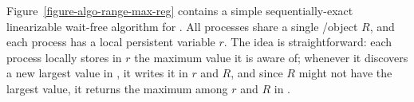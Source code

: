 Figure~\ref{figure-algo-range-max-reg} contains a simple sequentially-exact linearizable wait-free algorithm for \RangeMaxReg. All processes share a single \R/\W object \(R\), and each process has a local persistent variable \(r\). The idea is straightforward: each process locally stores in \(r\) the maximum value it is aware of; whenever it discovers a new largest value in \RMaxW, it writes it in \(r\) and \(R\), and since \(R\) might not have the largest value, it returns the maximum among \(r\) and \(R\) in \RMaxR.


\begin{figure}[H]
\end{figure}
